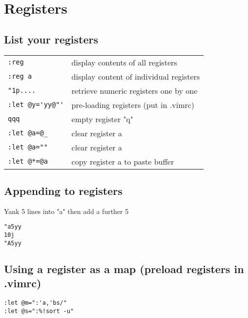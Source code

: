 \section{Registers}

\subsection{List your registers}
\begin{center}
\begin{longtable}{l|l}
\verb!:reg! & display contents of all registers\\
\verb!:reg a! & display content of individual registers\\
\verb!"1p....! & retrieve numeric registers one by one\\
\verb!:let @y='yy@"'! & pre-loading registers (put in .vimrc)\\
\verb!qqq! & empty register "q"\\
\verb!:let @a=@_! & clear register a\\
\verb!:let @a=""! & clear register a\\
\verb!:let @*=@a! & copy register a to paste buffer\\
\end{longtable}
\end{center}

\subsection{Appending to registers}

Yank 5 lines into "a" then add a further 5

\begin{verbatim}
"a5yy
10j
"A5yy
\end{verbatim}

\subsection{Using a register as a map (preload registers in .vimrc)}
\begin{verbatim}
:let @m=":'a,'bs/"
:let @s=":%!sort -u"
\end{verbatim}

